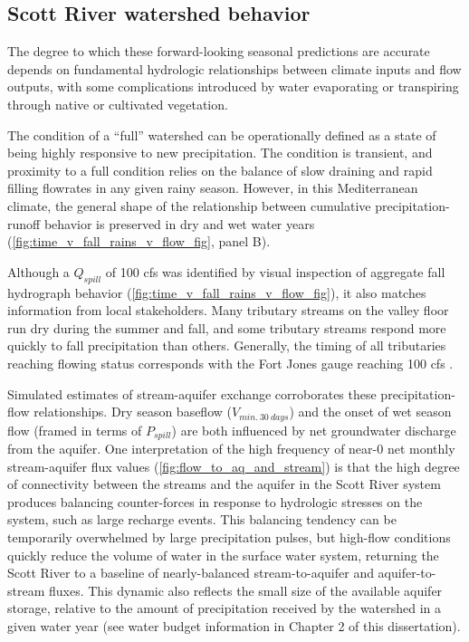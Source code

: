 \documentclass[hess, manuscript]{copernicus}
\begin{document}
\subsection{Scott River watershed behavior}

The degree to which these forward-looking seasonal predictions are
accurate depends on fundamental hydrologic relationships between climate
inputs and flow outputs, with some complications introduced by water
evaporating or transpiring through native or cultivated vegetation.

The condition of a ``full'' watershed can be operationally defined as a
state of being highly responsive to new precipitation. The condition is
transient, and proximity to a full condition relies on the balance of
slow draining and rapid filling flowrates in any given rainy season.
However, in this Mediterranean climate, the general shape of the
relationship between cumulative precipitation-runoff behavior is
preserved in dry and wet water years
(\autoref{fig:time_v_fall_rains_v_flow_fig}, panel B).

Although a \(Q_{spill}\) of 100 cfs was identified by visual inspection
of aggregate fall hydrograph behavior
(\autoref{fig:time_v_fall_rains_v_flow_fig}), it also matches
information from local stakeholders. Many tributary streams on the
valley floor run dry during the summer and fall, and some tributary
streams respond more quickly to fall precipitation than others.
Generally, the timing of all tributaries reaching flowing status
corresponds with the Fort Jones gauge reaching 100 cfs
\citep{Sommarstrom2020}.

Simulated estimates of stream-aquifer exchange corroborates these
precipitation-flow relationships. Dry season baseflow
(\(V_{min.~30~days}\)) and the onset of wet season flow (framed in terms
of \(P_{spill}\)) are both influenced by net groundwater discharge from
the aquifer. One interpretation of the high frequency of near-0 net
monthly stream-aquifer flux values (\autoref{fig:flow_to_aq_and_stream})
is that the high degree of connectivity between the streams and the
aquifer in the Scott River system produces balancing counter-forces in
response to hydrologic stresses on the system, such as large recharge
events. This balancing tendency can be temporarily overwhelmed by large
precipitation pulses, but high-flow conditions quickly reduce the volume
of water in the surface water system, returning the Scott River to a
baseline of nearly-balanced stream-to-aquifer and aquifer-to-stream
fluxes. This dynamic also reflects the small size of the available
aquifer storage, relative to the amount of precipitation received by the
watershed in a given water year (see water budget information in Chapter
2 of this dissertation).
\end{document}
